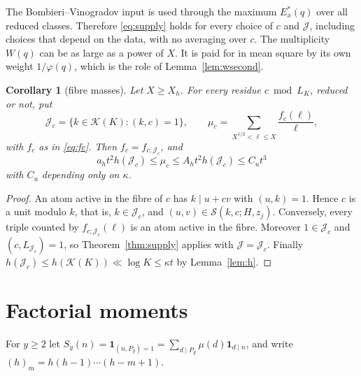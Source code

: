 \documentclass[10pt,reqno]{amsart}
\newtheorem{corollary}[theorem]{Corollary}
\theoremstyle{remark}
\newcommand{\K}{\mathcal K}
\newcommand{\J}{\mathcal J}
\newcommand{\Sset}{\mathcal S}
\newcommand{\ind}{\mathbf1}
\begin{document}
The Bombieri--Vinogradov input is used through the maximum $E_x^*(q)$
over all reduced classes.  Therefore \eqref{eq:supply} holds for every
choice of $c$ and $\J$, including choices that depend on the data, with no
averaging over $c$.  The multiplicity $W(q)$ can be as large as a power of
$X$.  It is paid for in mean square by its own weight $1/\varphi(q)$,
which is the role of Lemma~\ref{lem:wsecond}.

\begin{corollary}[fibre masses]\label{cor:fibremass}
Let $X\geq X_h$.  For every residue $c\bmod L_K$, reduced or not, put
\[
 \J_c=\{k\in\K(K):(k,c)=1\},\qquad
 \mu_c=\sum_{X^{1/2}<\ell\leq X}\frac{f_c(\ell)}\ell,
\]
with $f_c$ as in \eqref{eq:fc}.  Then $f_c=f_{c;\J_c}$, and
\begin{equation}\label{eq:fibremass}
 a_ht^2h(\J_c)\leq\mu_c\leq A_ht^2h(\J_c)\leq C_ut^3
\end{equation}
with $C_u$ depending only on $\kappa$.
\end{corollary}
\begin{proof}
An atom active in the fibre of $c$ has $k\mid u+cv$ with
$(u,k)=1$.  Hence $c$ is a unit modulo $k$, that is, $k\in\J_c$, and
$(u,v)\in\Sset(k,c;H,z_j)$.  Conversely, every triple counted by
$f_{c;\J_c}(\ell)$ is an atom active in the fibre.  Moreover $1\in\J_c$
and $(c,L_{\J_c})=1$, so Theorem~\ref{thm:supply} applies with
$\J=\J_c$.  Finally $h(\J_c)\leq h(\K(K))\ll\log K\leq\kappa t$ by
Lemma~\ref{lem:h}.
\end{proof}

\section{Factorial moments}\label{sec:moments}
For $y\geq2$ let $S_y(n)=\ind_{(n,P_y)=1}=\sum_{d\mid P_y}\mu(d)\ind_{d\mid n}$,
and write $(h)_m=h(h-1)\cdots(h-m+1)$.
\end{document}

